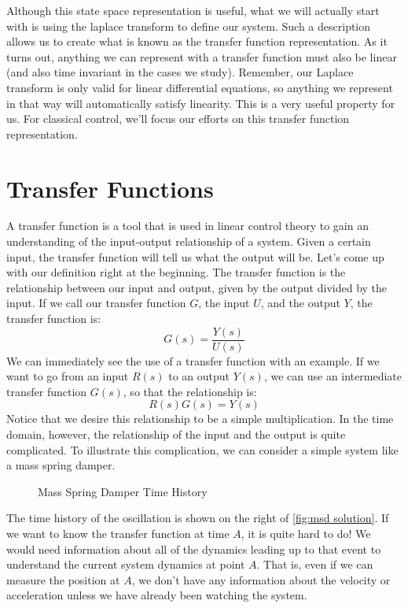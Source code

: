 Although this state space representation is useful, what we will actually start with is using the \gls{laplace transform} to define our system. Such a description allows us to create what is known as the \gls{transfer function} representation. As it turns out, anything we can represent with a \gls{transfer function} must also be linear (and also time invariant in the cases we study). Remember, our Laplace transform is only valid for linear differential equations, so anything we represent in that way will automatically satisfy linearity. This is a very useful property for us. For classical control, we'll focus our efforts on this transfer function representation.

\section{Transfer Functions}
A \gls{transfer function} is a tool that is used in linear control theory to gain an understanding of the input-output relationship of a system. Given a certain input, the transfer function will tell us what the output will be. Let's come up with our definition right at the beginning. The transfer function is the relationship between our input and output, given by the output divided by the input. If we call our transfer function $G$, the input $U$, and the output $Y$, the transfer function is:
$$G(s)=\frac{Y(s)}{U(s)}$$
We can immediately see the use of a transfer function with an example. If we want to go from an input $R(s)$ to an output $Y(s)$, we can use an intermediate \gls{transfer function} $G(s)$, so that the relationship is:
$$R(s)G(s)=Y(s)$$
Notice that we desire this relationship to be a simple multiplication. In the time domain, however, the relationship of the input and the output is quite complicated. To illustrate this complication, we can consider a simple system like a mass spring damper.
\begin{figure}[ht]
    \centering



    \caption{Mass Spring Damper Time History}
    \label{fig:msd solution}
\end{figure}

The time history of the oscillation is shown on the right of \autoref{fig:msd solution}. If we want to know the transfer function at time $A$, it is quite hard to do! We would need information about all of the dynamics leading up to that event to understand the current system dynamics at point $A$. That is, even if we can measure the position at $A$, we don't have any information about the velocity or acceleration unless we have already been watching the system.

